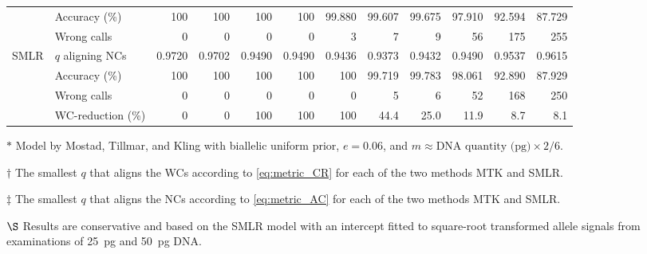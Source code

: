 \begin{table*}
\begin{adjustbox}{max width=\textwidth}
\begin{threeparttable}
\begin{tabular}{llrrrrrrrrrr}
\cmidrule(lr){2-12}
   & Accuracy (\%) & 100 & 100 & 100 & 100 & 99.880 & 99.607 & 99.675 & 97.910 & 92.594 & 87.729 \\ 
   & Wrong calls & 0 & 0 & 0 & 0 & 3 & 7 & 9 & 56 & 175 & 255 \\ 
\midrule[2pt]
\multirow{4}{*}{SMLR\tnote{$\S$}} & $q$ aligning NCs\tnote{$\ddagger$} & 0.9720 & 0.9702 & 0.9490 & 0.9490 & 0.9436 & 0.9373 & 0.9432 & 0.9490 & 0.9537 & 0.9615 \\ 
\cmidrule(lr){2-12}
   & Accuracy (\%) & 100 & 100 & 100 & 100 & 100 & 99.719 & 99.783 & 98.061 & 92.890 & 87.929 \\ 
   & Wrong calls & 0 & 0 & 0 & 0 & 0 & 5 & 6 & 52 & 168 & 250 \\ 
\cmidrule(lr){2-12}
   & WC-reduction (\%) & 0 & 0 & 100 & 100 & 100 & 44.4 & 25.0 & 11.9 & 8.7 & 8.1 \\ 
   \bottomrule[2pt]
\end{tabular}
\begin{tablenotes}
\item[$*$] Model by Mostad, Tillmar, and Kling with biallelic uniform prior, $e=0.06$, and $m\approx \text{DNA quantity (pg)} \times 2/6$.
\item[$\dagger$] The smallest $q$ that aligns the WCs according to \eqref{eq:metric_CR} for each of the two methods MTK and SMLR.
\item[$\ddagger$] The smallest $q$ that aligns the NCs according to \eqref{eq:metric_AC} for each of the two methods MTK and SMLR.
\item[$\S$] Results are conservative and based on the SMLR model with an intercept fitted to square-root transformed allele signals from examinations of \SI{25}{\pg} and \SI{50}{\pg} DNA.
\end{tablenotes}
\end{threeparttable}
\end{adjustbox}
\end{table*}
